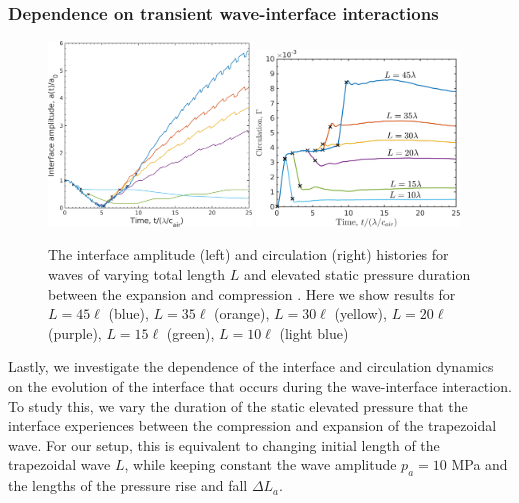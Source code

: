 \subsubsection{Dependence on transient wave-interface interactions}%
\begin{figure}
  \centering
  \includegraphics[width=0.48\textwidth]{./figs/lung_figs/interface_multi-lag}
  \includegraphics[width=0.48\textwidth]{./figs/lung_figs/circulation_multi-lag_fixed}
  \caption[The interface and circulation dependence on wave
  duration]{The interface amplitude (left) and circulation (right)
    histories for waves of varying total length $L$ and elevated
    static pressure duration between the expansion and compression
    . Here we show results for $L=45\ell$ (blue), $L=35\ell$ (orange),
    $L=30\ell$ (yellow), $L=20\ell$ (purple), $L=15\ell$ (green),
    $L=10\ell$ (light blue)}
  \label{fig:trapz_circ_interface_multi-lag}
\end{figure}
Lastly, we investigate the dependence of the interface and circulation
dynamics on the evolution of the interface that occurs during the
wave-interface interaction. To study this, we vary the duration of the
static elevated pressure that the interface experiences between the
compression and expansion of the trapezoidal wave. For our setup, this
is equivalent to changing initial length of the trapezoidal wave $L$,
while keeping constant the wave amplitude $p_a=10$ MPa and the lengths
of the pressure rise and fall $\Delta L_a$. 

